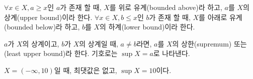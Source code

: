 \begin{definition}
  \label{def:bound}
  $\forall x \in X, a \geq x$인 $a$가 존재 할 때, $X$를 
  위로 유계(bounded above)라 하고, $a$를 $X$의 상계(upper bound)이라 한다.
  $\forall x \in X, b \leq x$인 $b$가 존재 할 때, $X$를 
  아래로 유계(bounded below)라 하고, $b$를 $X$의 하계(lower bound)이라 한다.
\end{definition}

\begin{definition}
  \label{def:supremum}
  $a$가 $X$의 상계이고, $b$가 $X$의 상계일 때, $a \neq b$라면, $a$를 $X$의 상한(supremum)
  또는 (least upper bound)라 한다. 기호로는 $\sup X = a$로 나타낸다.
\end{definition}
$X = (-\infty, 10)$일 때, 최댓값은 없고, $\sup X = 10$이다.